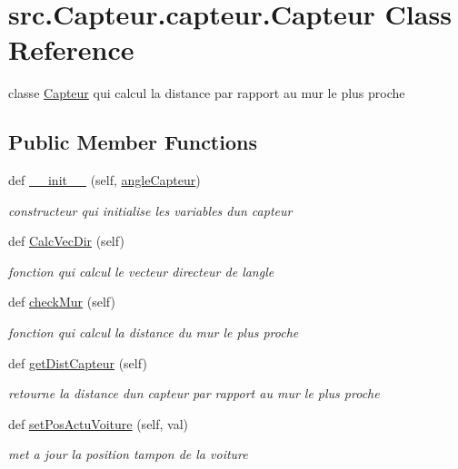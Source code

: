 \hypertarget{classsrc_1_1_capteur_1_1capteur_1_1_capteur}{}\section{src.\+Capteur.\+capteur.\+Capteur Class Reference}
\label{classsrc_1_1_capteur_1_1capteur_1_1_capteur}


classe \hyperlink{classsrc_1_1_capteur_1_1capteur_1_1_capteur}{Capteur} qui calcul la distance par rapport au mur le plus proche  


\subsection*{Public Member Functions}
\begin{DoxyCompactItemize}
\item 
def \hyperlink{classsrc_1_1_capteur_1_1capteur_1_1_capteur_abf779565fbdf63a3e3406165fb2182b2}{\+\_\+\+\_\+init\+\_\+\+\_\+} (self, \hyperlink{classsrc_1_1_capteur_1_1capteur_1_1_capteur_a40d8a8d89f4a45252c79eebf94eb1971}{angle\+Capteur})
\begin{DoxyCompactList}\small\item\em constructeur qui initialise les variables d\textquotesingle{}un capteur \end{DoxyCompactList}\item 
def \hyperlink{classsrc_1_1_capteur_1_1capteur_1_1_capteur_a620b8aef4fd51d712725e22cb80c4c15}{Calc\+Vec\+Dir} (self)
\begin{DoxyCompactList}\small\item\em fonction qui calcul le vecteur directeur de l\textquotesingle{}angle \end{DoxyCompactList}\item 
def \hyperlink{classsrc_1_1_capteur_1_1capteur_1_1_capteur_a4a3d1935b2f2f78b1b95b1ea72632d88}{check\+Mur} (self)
\begin{DoxyCompactList}\small\item\em fonction qui calcul la distance du mur le plus proche \end{DoxyCompactList}\item 
def \hyperlink{classsrc_1_1_capteur_1_1capteur_1_1_capteur_a59ee0bd667c48d89c8f3a3566f50c30b}{get\+Dist\+Capteur} (self)
\begin{DoxyCompactList}\small\item\em retourne la distance d\textquotesingle{}un capteur par rapport au mur le plus proche \end{DoxyCompactList}\item 
def \hyperlink{classsrc_1_1_capteur_1_1capteur_1_1_capteur_aed740c4f78618ac121c657cea8adbf7e}{set\+Pos\+Actu\+Voiture} (self, val)
\begin{DoxyCompactList}\small\item\em met a jour la position tampon de la voiture \end{DoxyCompactList}\end{DoxyCompactItemize}
